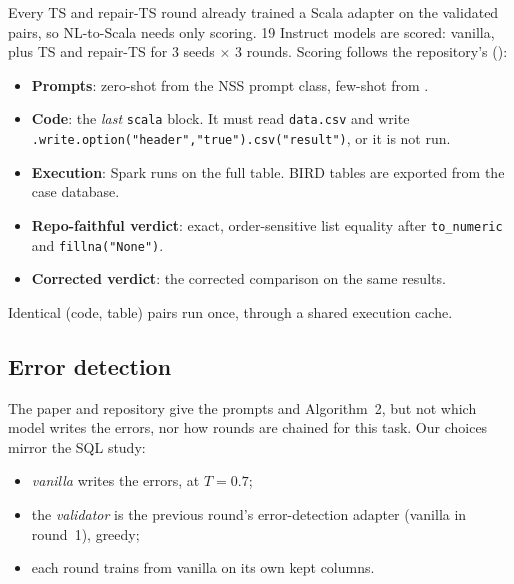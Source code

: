 Every TS and repair-TS round already trained a Scala adapter on the validated pairs, so NL-to-Scala needs only scoring.
19 Instruct models are scored: vanilla, plus TS and repair-TS for 3 seeds $\times$ 3 rounds. Scoring follows the
repository's  ():
\begin{itemize}
\item \textbf{Prompts}: zero-shot from the NSS prompt class, few-shot from .
\item \textbf{Code}: the \emph{last} \texttt{scala} block. It must read \texttt{data.csv} and write
\texttt{.write.option("header","true").csv("result")}, or it is not run.
\item \textbf{Execution}: Spark runs on the full table. BIRD tables are exported from the case database.
\item \textbf{Repo-faithful verdict}: exact, order-sensitive list equality after \texttt{to\_numeric} and
\texttt{fillna("None")}.
\item \textbf{Corrected verdict}: the corrected comparison on the same results.
\end{itemize}
Identical (code, table) pairs run once, through a shared execution cache.

\subsection{Error detection}\label{sec:method-ed}

\begin{oursbox}[title={Choices the paper leaves open}]
The paper and repository give the prompts and Algorithm~2, but not which model writes the errors, nor how rounds are
chained for this task. Our choices mirror the SQL study:
\begin{itemize}
\item \emph{vanilla} writes the errors, at $T=0.7$;
\item the \emph{validator} is the previous round's error-detection adapter (vanilla in round~1), greedy;
\item each round trains from vanilla on its own kept columns.
\end{itemize}
\end{oursbox}

